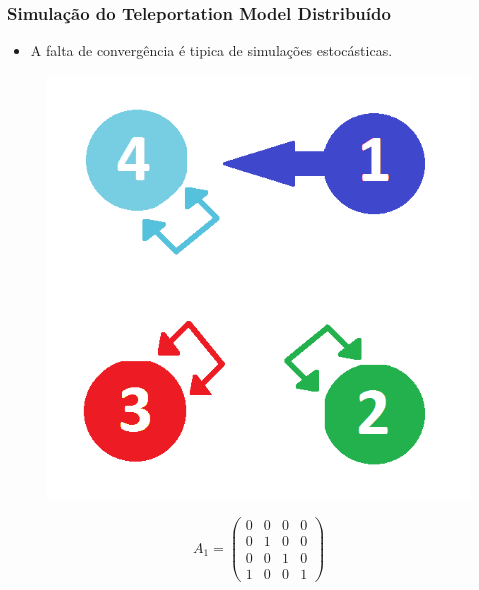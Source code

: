 \documentclass{beamer}
\begin{document}
\begin{frame}
	\frametitle{Simulação do Teleportation Model Distribuído}

\begin{itemize}
	\item A falta de convergência é tipica de simulações estocásticas.
\end{itemize}

\begin{figure}[!htb]
	\centering
	\includegraphics[scale=0.20]{figures/loop}
	\label{}
\end{figure}

\vspace{-0.5cm}

\begin{equation}\nonumber
A_1 = \begin{pmatrix}
 0 & 0 & 0 &  0 \\
 0 & 1 & 0 &  0 \\
 0 & 0 & 1 &  0  \\
 1 & 0 & 0 &  1
\end{pmatrix}
\end{equation}		
	
\end{frame}
\end{document}
